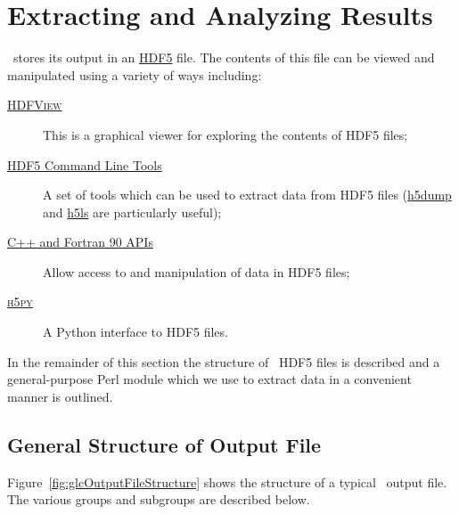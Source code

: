 \chapter{Extracting and Analyzing Results}

\glc\ stores its output in an \href{http://www.hdfgroup.org/HDF5/}{HDF5} file. The contents of this file can be viewed and manipulated using a variety of ways including:
\begin{description}
 \item[\href{http://www.hdfgroup.org/hdf-java-html/hdfview/}{{\normalfont \scshape HDFView}}] This is a graphical viewer for exploring the contents of HDF5 files;
 \item[\href{http://www.hdfgroup.org/products/hdf5_tools/index.html\#h5dist}{HDF5 Command Line Tools}] A set of tools which can be used to extract data from HDF5 files (\href{http://www.hdfgroup.org/HDF5/doc/RM/Tools.html#Tools-Dump}{{\normalfont \ttfamily h5dump}} and \href{http://www.hdfgroup.org/HDF5/doc/RM/Tools.html#Tools-Ls}{{\normalfont \ttfamily h5ls}} are particularly useful);
 \item[\href{http://www.hdfgroup.org/HDF5/doc/RM/RM_H5Front.html\#F90andCPPlus}{C++ and Fortran 90 APIs}] Allow access to and manipulation of data in HDF5 files;
 \item[\href{http://code.google.com/p/h5py/}{{\normalfont \scshape h5py}}] A Python interface to HDF5 files.
\end{description}

In the remainder of this section the structure of \glc\ HDF5 files is described and a general-purpose Perl module which we use to extract data in a convenient manner is outlined.

\section{General Structure of Output File}

Figure~\ref{fig:glcOutputFileStructure} shows the structure of a typical \glc\ output file. The various groups and subgroups are described below.

